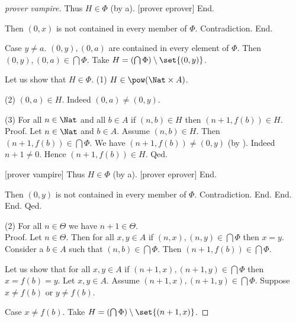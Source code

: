 \documentclass{article}
\begin{document}
\begin{forthel}
\begin{proof}
                  [prover vampire]
                  Thus $H \in \Phi$ (by a).
                  [prover eprover]
                End.

                Then $(0,x)$ is not contained in every member of $\Phi$.
                Contradiction.
              End.

              Case $y \neq a$.
                $(0,y), (0,a)$ are contained in every element of $\Phi$.
                Then $(0,y), (0,a) \in \bigcap \Phi$.
                Take $H = (\bigcap \Phi) \setminus \set{(0,y)}$.

                Let us show that $H \in \Phi$.
                  (1) $H \in \pow(\Nat \times A)$.

                  (2) $(0,a) \in H$.
                  Indeed $(0,a) \neq (0,y)$.

                  (3) For all $n \in \Nat$ and all $b \in A$ if
                  $(n,b) \in H$ then $(n + 1, f(b)) \in H$. \\
                  Proof.
                    Let $n \in \Nat$ and $b \in A$.
                    Assume $(n,b) \in H$.
                    Then $(n + 1, f(b)) \in \bigcap \Phi$.
                    We have $(n + 1, f(b)) \neq (0,y)$ (by ).
                    Indeed $n + 1 \neq 0$.
                    Hence $(n + 1, f(b)) \in H$.
                  Qed.

                  [prover vampire]
                  Thus $H \in \Phi$ (by a).
                  [prover eprover]
                End.

                Then $(0,y)$ is not contained in every member of $\Phi$.
                Contradiction.
              End.
            End.
          End.
        Qed.

        (2) For all $n \in \Theta$ we have $n + 1 \in \Theta$. \\
        Proof.
          Let $n \in \Theta$.
          Then for all $x, y \in A$ if $(n, x), (n, y) \in \bigcap \Phi$ then
          $x = y$.
          Consider a $b \in A$ such that $(n,b) \in \bigcap \Phi$.
          Then $(n + 1, f(b)) \in \bigcap \Phi$.

          Let us show that for all $x, y \in A$ if $(n + 1, x),
          (n + 1, y) \in \bigcap \Phi$ then $x = f(b) = y$.
            Let $x, y \in A$.
            Assume $(n + 1, x), (n + 1, y) \in \bigcap \Phi$.
            Suppose $x \neq f(b)$ or $y \neq f(b)$.

            Case $x \neq f(b)$.
              Take $H = (\bigcap \Phi) \setminus \set{(n + 1,x)}$.


\end{proof}
\end{forthel}
\end{document}
